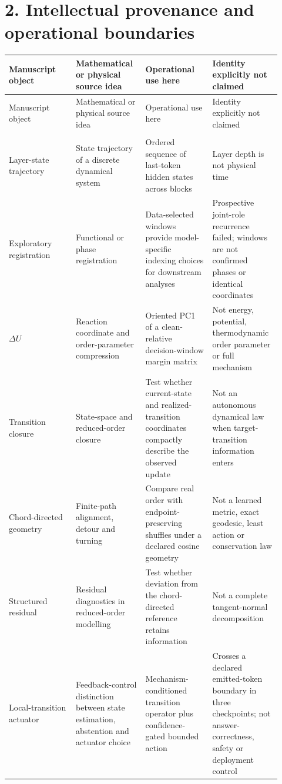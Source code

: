 \documentclass[10pt]{article}
\begin{document}
\section*{2. Intellectual provenance and operational boundaries}

\fontsize{7}{7.8}\selectfont
\setlength{\tabcolsep}{2.5pt}
\renewcommand{\arraystretch}{1.08}
\begin{longtable}{@{}>{\RaggedRight\arraybackslash}p{0.230\linewidth}>{\RaggedRight\arraybackslash}p{0.230\linewidth}>{\RaggedRight\arraybackslash}p{0.230\linewidth}>{\RaggedRight\arraybackslash}p{0.230\linewidth}@{}}
\toprule
Manuscript object & Mathematical or physical source idea & Operational use here & Identity explicitly not claimed \\
\midrule
\endfirsthead
\toprule
Manuscript object & Mathematical or physical source idea & Operational use here & Identity explicitly not claimed \\
\midrule
\endhead
\midrule
\multicolumn{4}{r}{\footnotesize Continued on next page} \\
\endfoot
\bottomrule
\endlastfoot
Layer-state trajectory & State trajectory of a discrete dynamical system & Ordered sequence of last-token hidden states across blocks & Layer depth is not physical time \\
Exploratory registration & Functional or phase registration & Data-selected windows provide model-specific indexing choices for downstream analyses & Prospective joint-role recurrence failed; windows are not confirmed phases or identical coordinates \\
\(\Delta U\) & Reaction coordinate and order-parameter compression & Oriented PC1 of a clean-relative decision-window margin matrix & Not energy, potential, thermodynamic order parameter or full mechanism \\
Transition closure & State-space and reduced-order closure & Test whether current-state and realized-transition coordinates compactly describe the observed update & Not an autonomous dynamical law when target-transition information enters \\
Chord-directed geometry & Finite-path alignment, detour and turning & Compare real order with endpoint-preserving shuffles under a declared cosine geometry & Not a learned metric, exact geodesic, least action or conservation law \\
Structured residual & Residual diagnostics in reduced-order modelling & Test whether deviation from the chord-directed reference retains information & Not a complete tangent-normal decomposition \\
Local-transition actuator & Feedback-control distinction between state estimation, abstention and actuator choice & Mechanism-conditioned transition operator plus confidence-gated bounded action & Crosses a declared emitted-token boundary in three checkpoints; not answer-correctness, safety or deployment control \\
\end{longtable}
\end{document}
